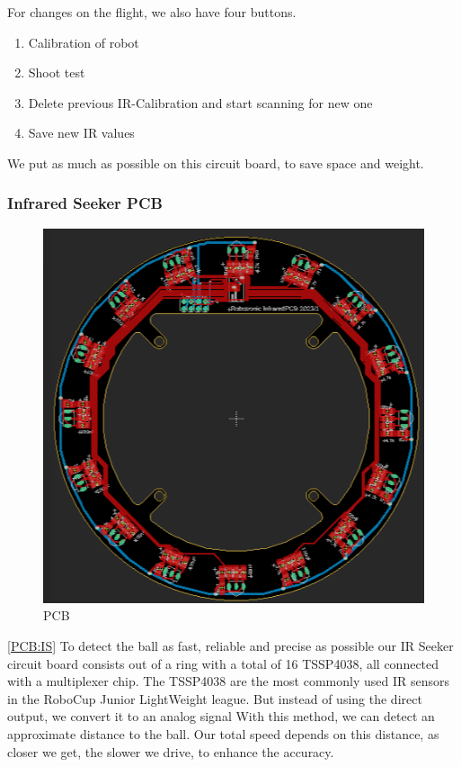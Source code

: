 \documentclass{scrartcl}
\begin{document}
\hfill \break
For changes on the flight, we also have four buttons. 
\begin{enumerate}
    \item{Calibration of robot}
    \item{Shoot test}
    \item{Delete previous IR-Calibration and start scanning for new one}
    \item{Save new IR values}
\end{enumerate}
\hfill \break

We put as much as possible on this circuit board, to save space and weight.

\subsubsection{Infrared Seeker PCB}

\begin{figure}
    \centering
    \includegraphics[width=0.75\linewidth]{img/eagle/IrSeekerPCB.png}
    \caption{PCB}
    \label{fig:ISPCB}
\end{figure}

\ref{PCB:IS} To detect the ball as fast, reliable and precise as possible
our IR Seeker circuit board consists out of a ring with a total of 16 TSSP4038,
all connected with a multiplexer chip. 
\newline
The TSSP4038 are the most commonly used IR sensors in the RoboCup Junior LightWeight
league. But instead of using the direct output, we convert it to an analog signal
With this method, we can detect an approximate distance to the ball. Our total speed
depends on this distance, as closer we get, the slower we drive, to enhance the accuracy. 
\end{document}
